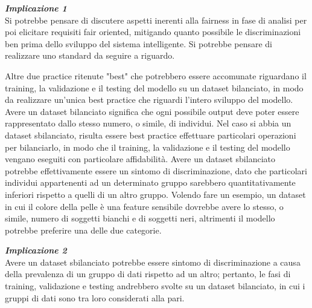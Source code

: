 \begin{center}
    \begin{tcolorbox}[width=400pt, colframe=black, colback=Gray!10]
			\begin{minipage}{\textwidth}
				\textit{\faCaretSquareORight  \textbf{ Implicazione 1}}\\
		     Si potrebbe pensare di discutere aspetti inerenti alla fairness in fase di analisi per poi elicitare requisiti fair oriented, mitigando quanto possibile le discriminazioni ben prima dello sviluppo del sistema intelligente. Si potrebbe pensare di realizzare uno standard da seguire a riguardo.
			\end{minipage}
	\end{tcolorbox}
\end{center}

Altre due practice ritenute "best" che potrebbero essere accomunate riguardano il training, la validazione e il testing del modello su un dataset bilanciato, in modo da realizzare un'unica best practice che riguardi l'intero sviluppo del modello. Avere un dataset bilanciato significa che ogni possibile output deve poter essere rappresentato dallo stesso numero, o simile, di individui. Nel caso si abbia un dataset sbilanciato, risulta essere best practice effettuare particolari operazioni per bilanciarlo, in modo che il training, la validazione e il testing del modello vengano eseguiti con particolare affidabilità. Avere un dataset sbilanciato potrebbe effettivamente essere un sintomo di discriminazione, dato che particolari individui appartenenti ad un determinato gruppo sarebbero quantitativamente inferiori rispetto a quelli di un altro gruppo. Volendo fare un esempio, un dataset in cui il colore della pelle è una feature sensibile dovrebbe avere lo stesso, o simile, numero di soggetti bianchi e di soggetti neri, altrimenti il modello potrebbe preferire una delle due categorie.

\begin{center}
    \begin{tcolorbox}[width=400pt, colframe=black, colback=Gray!10]
			\begin{minipage}{\textwidth}
				\textit{\faCaretSquareORight  \textbf{ Implicazione 2}}\\
		     Avere un dataset sbilanciato potrebbe essere sintomo di discriminazione a causa della prevalenza di un gruppo di dati rispetto ad un altro; pertanto, le fasi di training, validazione e testing andrebbero svolte su un dataset bilanciato, in cui i gruppi di dati sono tra loro considerati alla pari.
			\end{minipage}
	\end{tcolorbox}
\end{center}

